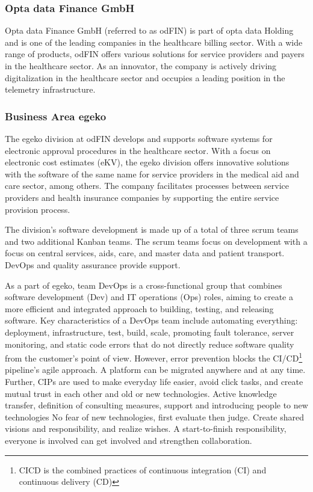 \subsubsection{Opta data Finance GmbH  }
Opta data Finance GmbH (referred to as odFIN) is part of opta data Holding and is one of the leading companies in the healthcare billing sector. With a wide range of products, odFIN offers various solutions for service providers and payers in the healthcare sector. As an innovator, the company is actively driving digitalization in the healthcare sector and occupies a leading position in the telemetry infrastructure.

\subsubsection{Business Area egeko }
The egeko division at odFIN develops and supports software systems for electronic approval procedures in the healthcare sector. With a focus on electronic cost estimates (eKV), the egeko division offers innovative solutions with the software of the same name for service providers in the medical aid and care sector, among others. The company facilitates processes between service providers and health insurance companies by supporting the entire service provision process.\vspace{.4cm}

The division's software development is made up of a total of three scrum teams and two additional Kanban teams. The scrum teams focus on development with a focus on central services, aids, care, and master data and patient transport. DevOps and quality assurance provide support.\vspace{.4cm} 

As a part of egeko, team DevOps is a cross-functional group that combines software development (Dev) and IT operations (Ops) roles, aiming to create a more efficient and integrated approach to building, testing, and releasing software. Key characteristics of a DevOps team include automating everything: deployment, infrastructure, test, build, scale, promoting fault tolerance, server monitoring, and static code errors that do not directly reduce software quality from the customer's point of view. However, error prevention blocks the CI/CD\footnote{CICD is the combined practices of continuous integration (CI) and continuous delivery (CD)} pipeline's agile approach. A platform can be migrated anywhere and at any time. Further, CIPs are used to make everyday life easier, avoid click tasks, and create mutual trust in each other and old or new technologies. Active knowledge transfer, definition of consulting measures, support and introducing people to new technologies No fear of new technologies, first evaluate then judge. Create shared visions and responsibility, and realize wishes. A start-to-finish responsibility, everyone is involved can get involved and strengthen collaboration.\vspace{.4cm}

